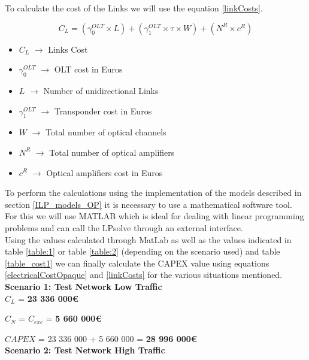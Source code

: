 To calculate the cost of the Links we will use the equation \ref{linkCosts}.

\begin{equation}
C_L = \left(\gamma_0^{OLT} \times L\right) + \left(\gamma_1^{OLT} \times \tau \times W\right) + \left(N^R \times c^R\right)
\label{linkCosts}
\end{equation}	
	
\begin{itemize}
\item{$C_L$				$\rightarrow$	Links Cost}
\item{$\gamma_0^{OLT}$	$\rightarrow$	OLT cost in Euros}
\item{$L$				$\rightarrow$	Number of unidirectional Links}
\item{$\gamma_1^{OLT}$	$\rightarrow$	Transponder cost in Euros}
\item{$W$             $\rightarrow$	Total number of optical channels}
\item{$N^R$				$\rightarrow$	Total number of optical amplifiers}
\item{$c^R$				$\rightarrow$	Optical amplifiers cost in Euros}
\end{itemize}

To perform the calculations using the implementation of the models described in section \ref{ILP_models_OP} it is necessary to use a mathematical software tool. For this we will use MATLAB which is ideal for dealing with linear programming problems and can call the LPsolve through an external interface. \\

Using the values calculated through MatLab as well as the values indicated in table \ref{table:1} or table \ref{table:2} (depending on the scenario used) and table \ref{table_cost1} we can finally calculate the CAPEX value using equations \ref{electricalCostOpaque} and \ref{linkCosts} for the various situations mentioned.\\

\textbf{Scenario 1: Test Network Low Traffic} \label{Scenario1_opaque} \\

$C_L$ = \textbf{23 336 000\euro}

$C_N$ = $C_{exc}$ = \textbf{5 660 000\euro}

$CAPEX$ = 23 336 000 + 5 660 000 = \textbf{28 996 000\euro}\\

\textbf{Scenario 2: Test Network High Traffic} \label{Scenario2_opaque} \\

